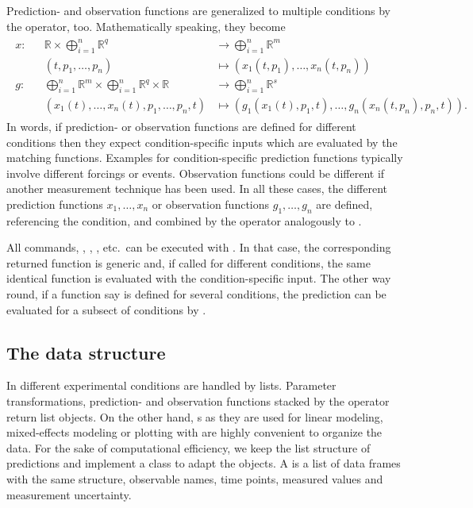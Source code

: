 \documentclass[article]{jss}
\begin{document}
Prediction- and observation functions are generalized to multiple conditions by the  operator, too. Mathematically speaking, they become
\begin{align*}
	\begin{aligned}
		x: &  & \mathbb R \times \bigoplus_{i = 1}^n \mathbb R^q & \longrightarrow  \bigoplus_{i = 1}^n \mathbb R^m \\
		 & & (t, p_1, \dots, p_n) & \longmapsto (x_1(t, p_1), \dots, x_n(t, p_n)) \\
		g: &  & \bigoplus_{i = 1}^n \mathbb R^m \times \bigoplus_{i = 1}^n \mathbb R^q\times \mathbb R& \longrightarrow  \bigoplus_{i = 1}^n \mathbb R^s \\
		& & (x_1(t), \dots, x_n(t), p_1, \dots, p_n, t) & \longmapsto (g_1(x_1(t), p_1, t), \dots, g_n(x_n(t, p_n), p_n, t)).
	\end{aligned}
	\label{}
\end{align*}
In words, if prediction- or observation functions are defined for different conditions then they expect condition-specific inputs which are evaluated by the matching functions. Examples for condition-specific prediction functions typically involve different forcings or events. Observation functions could be different if another  measurement technique has been used. In all these cases, the different prediction functions $x_1, \dots, x_n$ or observation functions $g_1, \dots, g_n$ are defined, referencing the condition, and combined by the  operator analogously to .

All commands, , , , etc.~can be executed with . In that case, the corresponding returned function is generic and, if called for different conditions, the same identical function is evaluated with the condition-specific input. The other way round, if a function say  is defined for several conditions, the prediction can be evaluated for a subsect of conditions by .

\subsection{The data structure}

In  different experimental conditions are handled by lists. Parameter transformations, prediction- and observation functions stacked by the  operator return list objects. On the other hand, s as they are used for linear modeling, mixed-effects modeling or plotting with  are highly convenient to organize the data. For the sake of computational efficiency, we keep the list structure of predictions and implement a class  to adapt the  objects. A  is a list of data frames with the same structure, observable names, time points, measured values and measurement uncertainty.
\end{document}
